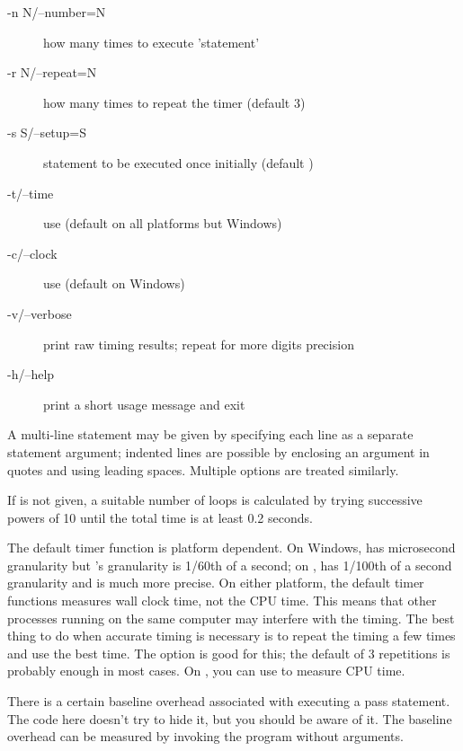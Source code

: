 \begin{description}
\item[-n N/--number=N] how many times to execute 'statement'
\item[-r N/--repeat=N] how many times to repeat the timer (default 3)
\item[-s S/--setup=S] statement to be executed once initially (default
)
\item[-t/--time] use 
(default on all platforms but Windows)
\item[-c/--clock] use  (default on Windows)
\item[-v/--verbose] print raw timing results; repeat for more digits
precision
\item[-h/--help] print a short usage message and exit
\end{description}

A multi-line statement may be given by specifying each line as a
separate statement argument; indented lines are possible by enclosing
an argument in quotes and using leading spaces.  Multiple
 options are treated similarly.

If  is not given, a suitable number of loops is
calculated by trying successive powers of 10 until the total time is
at least 0.2 seconds.

The default timer function is platform dependent.  On Windows,
 has microsecond granularity but
's granularity is 1/60th of a second; on \UNIX,
 has 1/100th of a second granularity and
 is much more precise.  On either platform, the
default timer functions measures wall clock time, not the CPU time.
This means that other processes running on the same computer may
interfere with the timing.  The best thing to do when accurate timing
is necessary is to repeat the timing a few times and use the best
time.  The  option is good for this; the default of 3
repetitions is probably enough in most cases.  On \UNIX, you can use
 to measure CPU time.

\begin{notice}
  There is a certain baseline overhead associated with executing a
  pass statement.  The code here doesn't try to hide it, but you
  should be aware of it.  The baseline overhead can be measured by
  invoking the program without arguments.
\end{notice}

